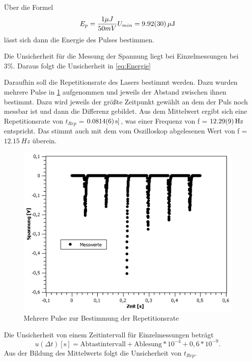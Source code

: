\documentclass[
	a4paper,
	12pt,
	pagesize,
	ngerman
]{scrartcl}
\begin{document}
Über die Formel
\begin{equation}
E_{p} = \dfrac{1 \mu J}{50mV}U_{min} = \SI{9,92 \pm 0,30}{\mu J} 
\label{eq:Energie}
\end{equation}
lässt sich dann die Energie des Pulses bestimmen.

Die Unsicherheit für die Messung der Spannung liegt bei Einzelmessungen bei 3\%. Daraus folgt die Unsicherheit in \cref{eq:Energie}

Daraufhin soll die Repetitionsrate des Lasers bestimmt werden. Dazu wurden mehrere Pulse in \cref{Rep} aufgenommen und jeweils der Abstand zwischen ihnen bestimmt. Dazu wird jeweils der größte Zeitpunkt gewählt an dem der Puls noch messbar ist und dann die Differenz gebildet. Aus dem Mittelwert ergibt sich eine Repetitionsrate von $t_{Rep}$ = $\SI{0,0814 \pm 0,0006}{s]}$, was einer Frequenz von f = $\SI{12,29 \pm 0,09}{Hz}$ entspricht. Das stimmt auch mit dem vom Oszilloskop abgelesenen Wert von f = $\SI{12,15}{Hz}$ überein.

\begin{figure}[h!]
	\centering
	\includegraphics[scale=0.7]{Rep.png}
	\caption{Mehrere Pulse zur Bestimmung der Repetitionsrate}
	\label{Rep}
\end{figure}

Die Unsicherheit von einem Zeitintervall für Einzelmessungen beträgt 
\begin{equation}
u(\Delta t)[\text{s}] = \text{Abtastintervall} + \text{Ablesung} *10^{-4} +0,6*10^{-9}.
\label{eq:ut}
\end{equation}
Aus der Bildung des Mittelwerts folgt die Unsicherheit von $t_{Rep}$.
\end{document}
